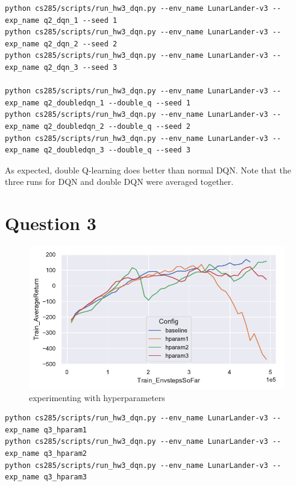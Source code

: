 \documentclass[letterpaper, 10pt]{article}
\begin{document}
\begin{lstlisting}[caption=Exact command line configurations]
python cs285/scripts/run_hw3_dqn.py --env_name LunarLander-v3 --exp_name q2_dqn_1 --seed 1
python cs285/scripts/run_hw3_dqn.py --env_name LunarLander-v3 --exp_name q2_dqn_2 --seed 2
python cs285/scripts/run_hw3_dqn.py --env_name LunarLander-v3 --exp_name q2_dqn_3 --seed 3

python cs285/scripts/run_hw3_dqn.py --env_name LunarLander-v3 --exp_name q2_doubledqn_1 --double_q --seed 1
python cs285/scripts/run_hw3_dqn.py --env_name LunarLander-v3 --exp_name q2_doubledqn_2 --double_q --seed 2
python cs285/scripts/run_hw3_dqn.py --env_name LunarLander-v3 --exp_name q2_doubledqn_3 --double_q --seed 3
\end{lstlisting}

As expected, double Q-learning does better than normal DQN. Note that the three runs for DQN and double DQN were averaged
together.

\newpage

\section{Question 3}
\begin{figure}[h]
\centering
\includegraphics{figures/q3.pdf}
\caption{experimenting with hyperparameters }
\end{figure}
\begin{lstlisting}[caption=Exact command line configurations]
python cs285/scripts/run_hw3_dqn.py --env_name LunarLander-v3 --exp_name q3_hparam1
python cs285/scripts/run_hw3_dqn.py --env_name LunarLander-v3 --exp_name q3_hparam2
python cs285/scripts/run_hw3_dqn.py --env_name LunarLander-v3 --exp_name q3_hparam3
\end{lstlisting}
\end{document}
